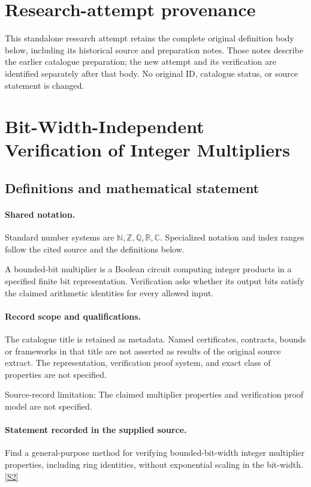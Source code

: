 \documentclass[11pt]{article}
\begin{document}
\section*{Research-attempt provenance}
This standalone research attempt retains the complete original definition body below,
including its historical source and preparation notes. Those notes describe the
earlier catalogue preparation; the new attempt and its verification are identified
separately after that body. No original ID, catalogue status, or source statement is changed.

\section{Bit-Width-Independent Verification of Integer Multipliers}\label{statement}

\subsection{Definitions and mathematical statement}

\paragraph{Shared notation.}Standard number systems are $\mathbb N,\mathbb Z,\mathbb Q,\mathbb R,\mathbb C$. Specialized notation and index ranges follow the cited source and the definitions below.


A bounded-bit multiplier is a Boolean circuit computing integer products in a specified finite bit representation. Verification asks whether its output bits satisfy the claimed arithmetic identities for every allowed input.
\paragraph{Record scope and qualifications.}
The catalogue title is retained as metadata. Named certificates, contracts, bounds or frameworks in that title are not asserted as results of the original source extract.
The representation, verification proof system, and exact class of properties are not specified.

Source-record limitation: The claimed multiplier properties and verification proof model are not specified.
\paragraph{Statement recorded in the supplied source.}
Find a general-purpose method for verifying bounded-bit-width integer multiplier properties, including ring identities, without exponential scaling in the bit-width. \href{https://doi.org/10.4171/owr/2017/37}{[S2]}
\end{document}
